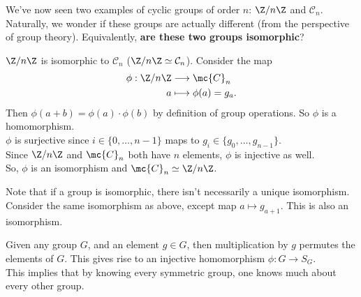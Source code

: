 \documentclass[math1530-lecture-notes]{subfiles}
\begin{document}
We've now seen two examples of cyclic groups of order $n $: $\Z/n\Z$ and $\mathcal{C}_n$. Naturally,
we wonder if these groups are actually different (from the perspective of group theory).
Equivalently,  \textbf{are these two groups isomorphic}?
\begin{example}
  $ \Z / n\Z$ is isomorphic to $\mathcal{C}_n$ ($ \Z / n\Z\simeq \mathcal{C}_n$). Consider the map
  \begin{align*}
    \phi: \Z / n\Z &\longrightarrow \mc{C}_n \\
    a &\longmapsto \phi(a) = g_a
  .\end{align*} Then $\phi(a+b)=\phi(a)\cdot \phi(b)$ by definition of group operations. So $\phi$ 
  is a homomorphism.\\
  $\phi$ is surjective since $i\in \{ 0,\ldots,n-1 \}$ maps to $g_i\in \{ g_0,\ldots,g_{n-1} \}$.
  \\Since $\Z / n\Z $ and $\mc{C}_n$ both have  $n$ elements, $\phi$ is injective as well. \\
  So, $\phi$ is an isomorphism and $\mc{C}_n \simeq \Z / n\Z$.
\end{example}

Note that if a group is isomorphic, there isn't necessarily a unique isomorphism. Consider the same
isomorphism as above, except map $a\mapsto g_{a+1}$. This is also an isomorphism.

\begin{example}
  Given any group $G$, and an element $g\in G$, then multiplication by $g$ permutes the elements of
  $G$. This gives rise to an injective homomorphism $\phi: G \to S_G$.\\

  This implies that by knowing every symmetric group, one knows much about every other group.
\end{example}
\end{document}
